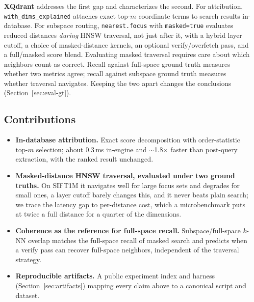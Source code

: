 \documentclass[sigconf,review,balance=false]{acmart}
\begin{document}
\textbf{XQdrant} addresses the first gap and characterizes the second. For
attribution, \texttt{with\_dims\_explained} attaches exact top-$m$ coordinate
terms to search results in-database. For subspace routing,
\texttt{nearest.focus} with \texttt{masked=true} evaluates reduced distances
\emph{during} HNSW traversal, not just after it, with a hybrid layer cutoff,
a choice of masked-distance kernels, an optional verify/overfetch pass, and a
full/masked score blend. Evaluating masked traversal requires care about which
neighbors count as correct. Recall against full-space ground truth measures
whether two metrics agree; recall against subspace ground truth measures
whether traversal navigates. Keeping the two apart changes the conclusions
(Section~\ref{sec:eval-gt}).

\subsection*{Contributions}
\vspace{-0.35em}
\begin{itemize}
  \setlength{\itemsep}{0.2em}
  \setlength{\parsep}{0pt}
  \setlength{\topsep}{0.15em}
  \setlength{\partopsep}{0pt}
  \item \textbf{In-database attribution.} Exact score decomposition with
    order-statistic top-$m$ selection; about 0.3\,ms in-engine and
    $\sim$1.8$\times$ faster than post-query extraction, with the ranked
    result unchanged.
  \item \textbf{Masked-distance HNSW traversal, evaluated under two ground
    truths.} On SIFT1M it navigates well for large focus sets and degrades
    for small ones, a layer cutoff barely changes this, and it never beats
    plain search; we trace the latency gap to per-distance cost, which a
    microbenchmark puts at twice a full distance for a quarter of the
    dimensions.
  \item \textbf{Coherence as the reference for full-space recall.}
    Subspace/full-space $k$-NN overlap matches the full-space recall of
    masked search and predicts when a verify pass can recover full-space
    neighbors, independent of the traversal strategy.
  \item \textbf{Reproducible artifacts.} A public experiment index and harness
    (Section~\ref{sec:artifacts}) mapping every claim above to a canonical
    script and dataset.
\end{itemize}

\end{document}
